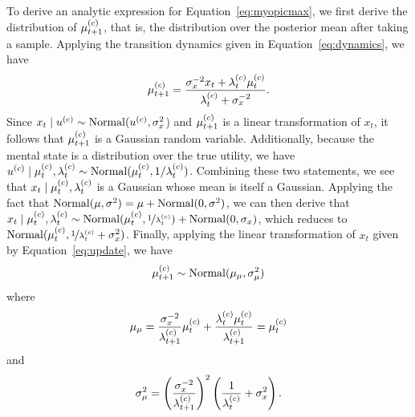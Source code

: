 To derive an analytic expression for Equation~\ref{eq:myopicmax}, we first derive the distribution of $\mu_{t+1}^{(c)}$, that is, the distribution over the posterior mean after taking a sample. Applying the transition dynamics given in Equation~\ref{eq:dynamics}, we have
%
\begin{equation}
  \label{eq:update}
  \mu_{t+1}^{(c)}=\frac
  {\sigma_{x}^{-2}x_t+\lambda_{t}^{(c)}\mu_{t}^{(c)}}
  {\lambda_{t}^{(c)}+\sigma_{x}^{-2}}.
\end{equation}
%
Since $x_t \mid u^{(c)} \sim \mathrm{Normal}(u^{(c)},\sigma_{x}^{2}$) and $\mu_{t+1}^{(c)}$ is a linear transformation of $x_t$, it follows that $\mu_{t+1}^{(c)}$ is a Gaussian random variable. Additionally, because the mental state is a distribution over the true utility, we have $u^{(c)} \mid \mu_{t}^{(c)}, \lambda_{t}^{(c)} \sim \mathrm{Normal}(\mu_{t}^{(c)},1/\lambda_{t}^{(c)})$. Combining these two statements, we see that $x_t \mid \mu_{t}^{(c)}, \lambda_{t}^{(c)}$ is a Gaussian whose mean is itself a Gaussian. Applying the fact that $\mathrm{Normal}(\mu, \sigma^2) = \mu + \mathrm{Normal}(0,  \sigma^2)$, we can then derive that $x_t \mid \mu_{t}^{(c)}, \lambda_{t}^{(c)} \sim \mathrm{Normal}(\mu_{t}^{(c)}, \nicefrac{1}{\lambda_{t}^{(c)}}) + \mathrm{Normal}(0, \sigma_x)$, which reduces to $\mathrm{Normal}(\mu_{t}^{(c)}, \nicefrac{1}{\lambda_{t}^{(c)}}+\sigma_{x}^{2})$.
Finally, applying the linear transformation of $x_t$ given by Equation~\ref{eq:update}, we have
%
\begin{equation}\label{eq:attention-marginal}
  \mu_{t+1}^{(c)} \sim
    \mathrm{Normal}(\mu_\mu, \sigma^2_\mu)
\end{equation}
where
\begin{equation}
  \mu_\mu =  \frac{\sigma_{x}^{-2}}{\lambda_{t+1}^{(c)}}\mu_{t}^{(c)}+\frac{\lambda_{t}^{(c)}\mu_{t}^{(c)}}{\lambda_{t+1}^{(c)}}=\mu_{t}^{(c)}
\end{equation}
and
\begin{equation}
  \sigma^2_\mu = {\left(\frac{\sigma_{x}^{-2}}{\lambda_{t+1}^{(c)}}\right)}^{2}\left(\frac{1}{\lambda_{t}^{(c)}}+\sigma_{x}^{2}\right).
\end{equation}
%

